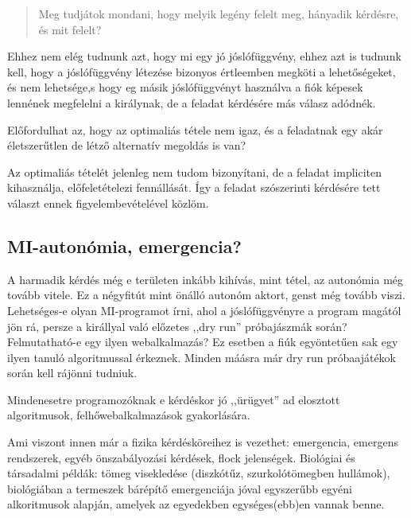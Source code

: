 \documentclass{article}
\begin{document}
	\begin{quotation}
		Meg tudjátok mondani, hogy melyik legény felelt meg, hányadik kérdésre, és mit felelt?
	\end{quotation}

	Ehhez nem elég tudnunk azt, hogy mi egy jó jóslófüggvény, ehhez azt is tudnunk kell, hogy a jóslófüggvény létezése bizonyos értleemben megköti a lehetőségeket, és nem lehetsége,s hogy eg másik jóslófüggvényt használva a fiók képesek lennének megfelelni a királynak, de a feladat kérdésére más válasz adódnék.

	Előfordulhat az, hogy az optimaliás tétele nem igaz, és a feladatnak egy akár életszerűtlen de létző alternatív megoldás is van?

	Az optimaliás tételét jelenleg nem tudom bizonyítani, de a feladat impliciten kihasználja, előfeletételezi fennállását. Így a feladat szószerinti kérdésére tett választ ennek figyelembevételével közlöm.

	\subsection{MI-autonómia, emergencia?}

	A harmadik kérdés még e területen inkább kihívás, mint tétel, az autonómia még tovább vitele. Ez a négyfitút mint önálló autonóm aktort, genst még tovább viszi. Lehetséges-e olyan MI-programot írni, ahol a jóslófüggvényre a program magától jön rá, persze a királlyal való előzetes ,,dry run'' próbajászmák során? Felmutatható-e egy ilyen webalkalmazás? Ez esetben a fiúk egyöntetűen sak egy ilyen tanuló algoritmussal érkeznek. Minden máásra már dry run próbaajátékok során kell rájönni tudniuk.

	Mindenesetre programozóknak e kérdéskor jó ,,ürügyet'' ad elosztott algoritmusok, felhőwebalkalmazások gyakorlására.

	Ami viszont innen már a fizika kérdésköreihez is vezethet: emergencia, emergens rendszerek, egyéb önszabályozási kérdések, flock jelenségek. Biológiai és társadalmi példák: tömeg visekledése (diszkótűz, szurkolótömegben hullámok), biológiában a termeszek bárépítő emergenciája jóval egyszerűbb egyéni alkoritmusok alapján, amelyek az egyedekben egységes(ebb)en vannak benne.
\end{document}
